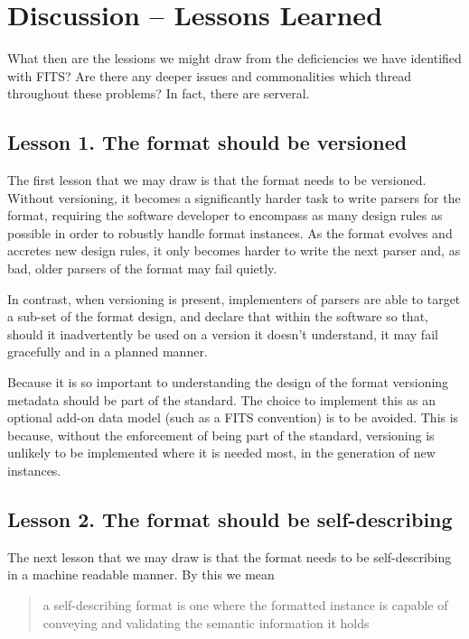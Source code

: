 \documentclass[final,authoryear,5p,times,twocolumn]{elsarticle}
\begin{document}
{{\section{Discussion -- Lessons Learned}

What then are the lessions we might draw from the deficiencies
we have identified with FITS? Are there any deeper issues and 
commonalities which thread throughout these problems? In fact,
there are serveral.


\subsection{Lesson 1. The format should be versioned}

The first lesson that we may draw is that the format needs to be
versioned. Without versioning, it becomes a significantly harder
task to write parsers for the format, requiring the software
developer to encompass as many design rules as possible in order
to robustly handle format instances. As the format evolves and
accretes new design rules, it only becomes harder to write the
next parser and, as bad, older parsers of the format may fail quietly.

In contrast, when versioning is present, implementers of parsers
are able to target a sub-set of the format design, and declare
that within the software so that, should it inadvertently be used
on a version it doesn't understand, it may fail gracefully and
in a planned manner.

Because it is so important to understanding the design of
the format versioning metadata should be part of the standard.
The choice to implement this as an optional add-on data model
(such as a FITS convention) is to be avoided. This is because,
without the enforcement of being part of the standard, versioning
is unlikely to be implemented where it is needed most, in the
generation of new instances.


\subsection{Lesson 2. The format should be self-describing}

The next lesson that we may draw is that the format needs to be 
self-describing in a machine readable manner. By this we mean 

\begin{quote}
a self-describing format is one where the formatted instance
is capable of conveying and validating the semantic information 
it holds
\end{quote}

}}
\end{document}

